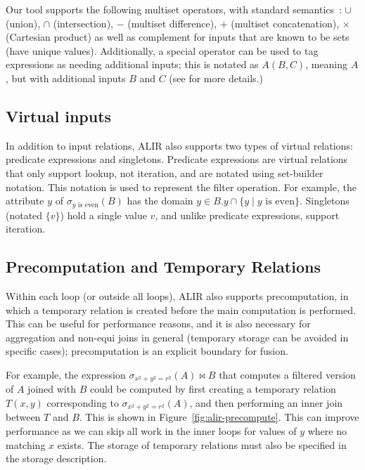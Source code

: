 \documentclass[acmsmall,screen,nonacm]{acmart}\settopmatter{printfolios=true,printccs=false,printacmref=false}
\DeclareMathOperator*{\ijoin}{\Join}
\begin{document}
Our tool supports the following multiset operators, with standard
semantics~\cite{mathematics-of-multisets}: $\cup$ (union), $\cap$ (intersection), $-$ (multiset
difference), $+$ (multiset concatenation), $\times$ (Cartesian product)
as well as complement for inputs that are known to be
sets (have unique values).
Additionally, a special operator can be used to tag expressions
as needing additional inputs; this is notated as $A(B, C)$,
meaning $A$, but with additional inputs $B$ and $C$ (see  for more details.)

\subsection{Virtual inputs}
\label{subsec:virtual-inputs}

In addition to input relations, ALIR also supports two types of virtual relations:
predicate expressions and singletons. Predicate expressions are virtual relations that only support lookup, not iteration, and are notated using set-builder notation.
This notation is used to represent the filter
operation. For example, the attribute $y$ of $\sigma_{y \text{ is even}}(B)$ has the domain
$y \in B.y \cap \{ y \mid y \text{ is even} \}$.
Singletons (notated $\{ v \}$) hold a single value $v$, and unlike predicate expressions,
support iteration.

\subsection{Precomputation and Temporary Relations}
\label{subsec:precomputation}

Within each loop (or outside all loops), ALIR also supports
precomputation, in which a temporary relation is created before the main computation is performed.
This can be useful for performance reasons, and it is also necessary for aggregation and non-equi joins
in general (temporary storage can be avoided in specific cases); precomputation is an explicit boundary for fusion.

For example, the expression $\sigma_{x^2 + y^2 = r^2}(A) \ijoin B$
that computes a filtered version of $A$ joined with $B$
could be computed by first
creating a temporary relation $T(x, y)$ corresponding to $\sigma_{x^2 + y^2 = r^2}(A)$, and then
performing an inner join between $T$ and $B$. This is shown in Figure~\ref{fig:alir-precompute}.
This can improve performance as we can skip all work in the inner loops
for values of $y$ where no matching $x$ exists.
The storage of temporary relations must also be specified in the
storage description.
\end{document}
